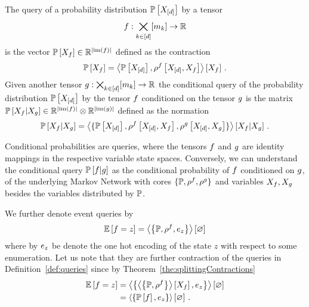 \begin{definition}\label{def:queries}
	The query of a probability distribution $\mathbb{P}\left[X_{[d]}\right]$ by a tensor 
		\[ f : \bigtimes_{k\in[d]}[m_{k}] \rightarrow \mathbb{R} \]
	is the vector $\mathbb{P}\left[X_{f}\right] \in \mathbb{R}^{\left|\mathrm{im}\left(f\right)\right|}$ defined as the contraction
	\begin{align*}
		\mathbb{P}\left[X_{f}\right] = \left\langle \mathbb{P}\left[X_{[d]}\right],\rho^{f}\left[X_{[d]},X_{f}\right]\right\rangle \left[ X_{f} \right] \, . 
	\end{align*}
	Given another tensor $g: \bigtimes_{k\in[d]}[m_{k}] \rightarrow \mathbb{R} $ the conditional query of the probability distribution $\mathbb{P}\left[X_{[d]}\right]$ by the tensor $f$ conditioned on the tensor $g$ is the matrix $\mathbb{P}\left[X_{f}|X_{g}\right]\in\mathbb{R}^{\left|\mathrm{im}\left(f\right)\right|}\otimes \mathbb{R}^{\left|\mathrm{im}\left(g\right)\right|}$ defined as the normation
	\begin{align*}
		\mathbb{P}\left[X_{f}|X_{g}\right] 
		= \left\langle \{
		\mathbb{P}\left[X_{[d]}\right],\rho^{f}\left[X_{[d]},X_{f}\right],\rho^{g}\left[X_{[d]},X_{g}\right]
		\}\right\rangle \left[ 
		X_{f} | X_{g}
		 \right] \, . 
	\end{align*}
\end{definition}

Conditional probabilities are queries, where the tensors $f$ and $g$ are identity mappings in the respective variable state spaces.
Conversely, we can understand the conditional query $\mathbb{P}\left[f|g\right]$ as the conditional probability of $f$ conditioned on $g$, of the underlying Markov Network with cores $\{\mathbb{P}, \rho^{f}, \rho^{g} \}$ and variables $X_{f},X_{g}$ besides the variables distributed by $\mathbb{P}$.

We further denote event queries by
	\[  \mathbb{E}\left[f=z\right] = \left\langle \left\{\mathbb{P},\rho^{f},e_{z}\right\}\right\rangle \left[ \varnothing \right] \]
where by $e_{z}$ be denote the one hot encoding of the state $z$ with respect to some enumeration.
Let us note that they are further contraction of the queries in Definition~\ref{def:queries} since by Theorem~\ref{the:splittingContractions}
\begin{align*}
	 \mathbb{E}\left[f=z\right] 
	& =  \left\langle \left\{ \left\langle \left\{\mathbb{P},\rho^{f}\right\}\right\rangle \left[ X_{f} \right] ,e_{z}\right\}\right\rangle \left[ \varnothing \right] \\
	& =  \left\langle \left\{ \mathbb{P}\left[f\right] ,e_{z}\right\}\right\rangle \left[ \varnothing \right] \, . 
\end{align*}

